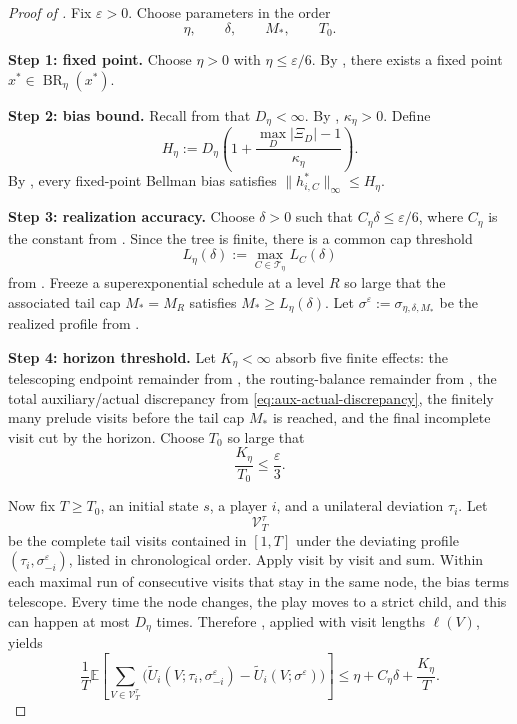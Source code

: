 \documentclass[12pt]{article}
\theoremstyle{definition}
\newcommand{\eps}{\varepsilon}
\newcommand{\E}{\mathbb{E}}
\newcommand{\1}{\mathbf{1}}
\newcommand{\cT}{\mathcal{T}}
\DeclareMathOperator{\BR}{BR}
\begin{document}
\begin{proof}[Proof of ]
Fix $\eps>0$. Choose parameters in the order
\[
\eta,\qquad \delta,\qquad M_*,\qquad T_0.
\]

\smallskip
\noindent\textbf{Step 1: fixed point.}
Choose $\eta>0$ with $\eta\le \eps/6$. By
, there exists a fixed point $x^*\in\BR_\eta(x^*)$.

\smallskip
\noindent\textbf{Step 2: bias bound.}
Recall from  that $D_\eta<\infty$. By
, $\kappa_\eta>0$. Define
\[
H_\eta:=D_\eta\left(1+\frac{\max_D|\Xi_D|-1}{\kappa_\eta}\right).
\]
By , every fixed-point Bellman bias satisfies
$\|h_{i,C}^*\|_\infty\le H_\eta$.

\smallskip
\noindent\textbf{Step 3: realization accuracy.}
Choose $\delta>0$ such that $C_\eta\delta\le \eps/6$, where $C_\eta$ is the
constant from . Since the tree is finite, there is a
common cap threshold
\[
L_\eta(\delta):=\max_{C\in\cT_\eta}L_C(\delta)
\]
from . Freeze a superexponential schedule at a level
$R$ so large that the associated tail cap $M_*=M_R$ satisfies
$M_*\ge L_\eta(\delta)$. Let
$\sigma^\eps:=\sigma_{\eta,\delta,M_*}$ be the realized profile from
.

\smallskip
\noindent\textbf{Step 4: horizon threshold.}
Let $K_\eta<\infty$ absorb five finite effects: the telescoping endpoint
remainder from , the routing-balance remainder from
, the total auxiliary/actual discrepancy from
\eqref{eq:aux-actual-discrepancy}, the finitely many prelude visits before the
tail cap $M_*$ is reached, and the final incomplete visit cut by the horizon.
Choose $T_0$ so large that
\[
\frac{K_\eta}{T_0}\le \frac{\eps}{3}.
\]

Now fix $T\ge T_0$, an initial state $s$, a player $i$, and a unilateral
deviation $\tau_i$. Let
\[
\mathcal V_T^{\tau}
\]
be the complete tail visits contained in $[1,T]$ under the deviating profile
$(\tau_i,\sigma^\eps_{-i})$, listed in chronological order. Apply
 visit by visit and sum. Within each maximal run of
consecutive visits that stay in the same node, the bias terms telescope. Every
time the node changes, the play moves to a strict child, and this can happen at
most $D_\eta$ times. Therefore , applied with visit
lengths $\ell(V)$, yields
\begin{equation}
\label{eq:aug-regret-aggregation}
\frac1T\E\left[
\sum_{V\in\mathcal V_T^{\tau}}
\bigl(
\widetilde U_i(V;\tau_i,\sigma^\eps_{-i})
-
\widetilde U_i(V;\sigma^\eps)
\bigr)
\right]
\le
\eta + C_\eta\delta + \frac{K_\eta}{T}.
\end{equation}


\end{proof}
\end{document}

